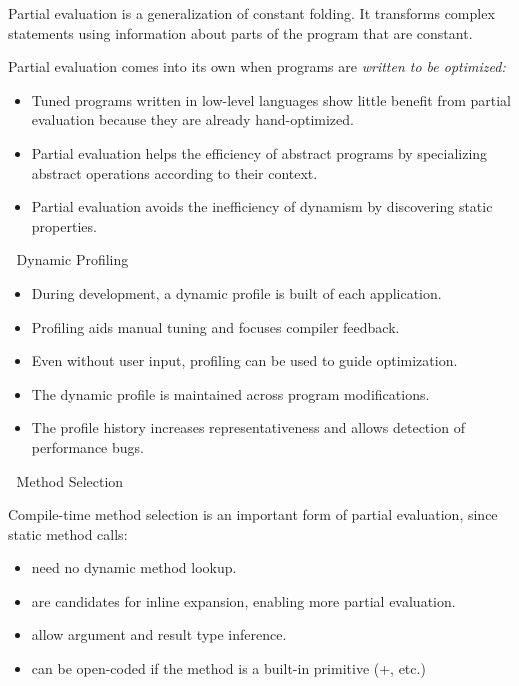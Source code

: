 Partial evaluation is a generalization of constant folding.  It transforms
complex statements using information about parts of the program that are
constant.

\vspace{1em}
Partial evaluation comes into its own when programs are {\it written to be
optimized:}
\begin{itemize}
\item Tuned programs written in low-level languages show little benefit from
partial evaluation because they are already hand-optimized.

\item Partial evaluation helps the efficiency of abstract programs by
specializing abstract operations according to their context.

\item Partial evaluation avoids the inefficiency of dynamism by discovering
static properties.
\end{itemize}


\newpage
Dynamic Profiling

\begin{itemize}
\item During development, a dynamic profile is built of each application.

\item Profiling aids manual tuning and focuses compiler feedback.

\item Even without user input, profiling can be used to guide optimization.

\item The dynamic profile is maintained across program modifications.

\item The profile history increases representativeness and allows detection of
performance bugs.
\end{itemize}


\newpage
Method Selection

Compile-time method selection is an important form of partial evaluation, since
static method calls:
\begin{itemize}
\item need no dynamic method lookup.

\item are candidates for inline expansion, enabling more partial evaluation.

\item allow argument and result type inference.

\item can be open-coded if the method is a built-in primitive (+, etc.)
\end{itemize}

